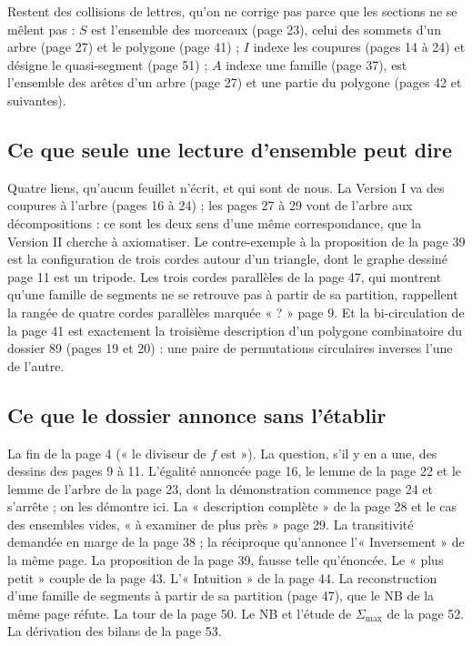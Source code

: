 \documentclass[11pt,a4paper]{article}
\begin{document}
Restent des collisions de lettres, qu'on ne corrige pas parce que les
sections ne se mêlent pas : $S$ est l'ensemble des morceaux (page 23), celui
des sommets d'un arbre (page 27) et le polygone (page 41) ; $I$ indexe les
coupures (pages 14 à 24) et désigne le quasi-segment (page 51) ; $A$ indexe
une famille (page 37), est l'ensemble des arêtes d'un arbre (page 27) et une
partie du polygone (pages 42 et suivantes).

\subsection*{Ce que seule une lecture d'ensemble peut dire}

Quatre liens, qu'aucun feuillet n'écrit, et qui sont de nous. La Version I
va des coupures à l'arbre (pages 16 à 24) ; les pages 27 à 29 vont de l'arbre
aux décompositions : ce sont les deux sens d'une même correspondance, que la
Version II cherche à axiomatiser. Le contre-exemple à la proposition de la
page 39 est la configuration de trois cordes autour d'un triangle, dont le
graphe dessiné page 11 est un tripode. Les trois cordes parallèles de la page
47, qui montrent qu'une famille de segments ne se retrouve pas à partir de
sa partition, rappellent la rangée de quatre cordes parallèles marquée
« ? » page 9. Et la bi-circulation de la page 41 est exactement la troisième
description d'un polygone combinatoire du dossier 89 (pages 19 et 20) : une
paire de permutations circulaires inverses l'une de l'autre.

\subsection*{Ce que le dossier annonce sans l'établir}

La fin de la page 4 (« le diviseur de $f$ est »). La question, s'il y en a
une, des dessins des pages 9 à 11. L'égalité annoncée page 16, le lemme de la
page 22 et le lemme de l'arbre de la page 23, dont la démonstration commence
page 24 et s'arrête ; on les démontre ici. La « description complète » de la
page 28 et le cas des ensembles vides, « à examiner de plus près » page 29.
La transitivité demandée en marge de la page 38 ; la réciproque qu'annonce
l'« Inversement » de la même page. La proposition de la page 39, fausse telle
qu'énoncée. Le « plus petit » couple de la page 43. L'« Intuition » de la
page 44. La reconstruction d'une famille de segments à partir de sa partition
(page 47), que le NB de la même page réfute. La tour de la page 50. Le NB et
l'étude de $\Sigma_{\max}$ de la page 52. La dérivation des bilans de la page
53.
\end{document}

